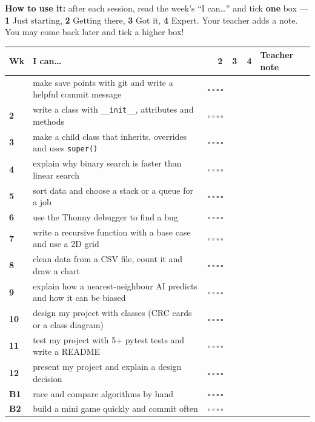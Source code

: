 \documentclass[level=3]{kidscode}
\newcommand{\fourboxes}{\large$\square$\,$\square$\,$\square$\,$\square$}
\begin{document}

\namedateline

\textbf{How to use it:} after each session, read the week's \enquote{I can\ldots} and tick
\textbf{one} box --- \textbf{1} Just starting, \textbf{2} Getting there, \textbf{3} Got it,
\textbf{4} Expert. Your teacher adds a note. You may come back later and tick a higher box!

\renewcommand{\arraystretch}{1.3}
\begin{longtable}{@{}>{\bfseries}p{0.75cm}>{\raggedright\arraybackslash}p{8.1cm}>{\centering\arraybackslash}p{2.5cm}p{\dimexpr\linewidth-11.35cm-6\tabcolsep}@{}}
\toprule
\rowcolor{kcaccent!15} Wk & I can\ldots & 1\ \ 2\ \ 3\ \ 4 & Teacher note\\ \midrule\endhead
\bottomrule\endfoot
1 & make save points with git and write a helpful commit message & \fourboxes & \\ \midrule
2 & write a class with \texttt{\_\_init\_\_}, attributes and methods & \fourboxes & \\ \midrule
3 & make a child class that inherits, overrides and uses \texttt{super()} & \fourboxes & \\ \midrule
4 & explain why binary search is faster than linear search & \fourboxes & \\ \midrule
5 & sort data and choose a stack or a queue for a job & \fourboxes & \\ \midrule
6 & use the Thonny debugger to find a bug & \fourboxes & \\ \midrule
7 & write a recursive function with a base case and use a 2D grid & \fourboxes & \\ \midrule
8 & clean data from a CSV file, count it and draw a chart & \fourboxes & \\ \midrule
9 & explain how a nearest-neighbour AI predicts and how it can be biased & \fourboxes & \\ \midrule
10 & design my project with classes (CRC cards or a class diagram) & \fourboxes & \\ \midrule
11 & test my project with 5+ pytest tests and write a README & \fourboxes & \\ \midrule
12 & present my project and explain a design decision & \fourboxes & \\ \midrule
B1 & race and compare algorithms by hand & \fourboxes & \\ \midrule
B2 & build a mini game quickly and commit often & \fourboxes & \\
\end{longtable}
\end{document}
